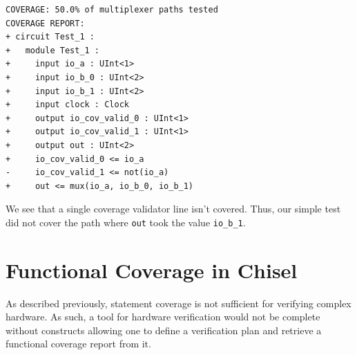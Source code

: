 \documentclass[a4paper]{IEEEtran}
\newcommand{\martin}[1]{{\color{blue} Martin: #1}}
\begin{document}
\begin{verbatim}
COVERAGE: 50.0% of multiplexer paths tested
COVERAGE REPORT:
+ circuit Test_1 :
+   module Test_1 :
+     input io_a : UInt<1>
+     input io_b_0 : UInt<2>
+     input io_b_1 : UInt<2>
+     input clock : Clock
+     output io_cov_valid_0 : UInt<1>
+     output io_cov_valid_1 : UInt<1>
+     output out : UInt<2>
+     io_cov_valid_0 <= io_a
-     io_cov_valid_1 <= not(io_a)
+     out <= mux(io_a, io_b_0, io_b_1)
\end{verbatim}
We see that a single coverage validator line isn't covered. Thus, our simple test did not cover the path where \texttt{out} took the value \texttt{io\_b\_1}.



\section{Functional Coverage in Chisel}
As described previously, statement coverage is not sufficient for verifying complex hardware. As such, a tool for hardware verification would not be complete without constructs allowing one to define a verification plan and retrieve a functional coverage report from it. %
\end{document}
